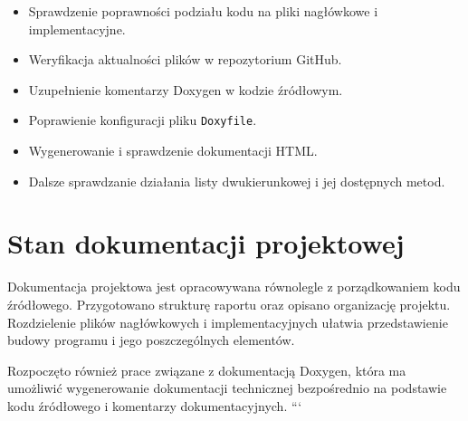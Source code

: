 \begin{itemize}
    \item Sprawdzenie poprawności podziału kodu na pliki
    nagłówkowe i implementacyjne.
    \item Weryfikacja aktualności plików w repozytorium GitHub.
    \item Uzupełnienie komentarzy Doxygen w kodzie źródłowym.
    \item Poprawienie konfiguracji pliku \texttt{Doxyfile}.
    \item Wygenerowanie i sprawdzenie dokumentacji HTML.
    \item Dalsze sprawdzanie działania listy dwukierunkowej
    i jej dostępnych metod.
\end{itemize}

\section{Stan dokumentacji projektowej}

Dokumentacja projektowa jest opracowywana równolegle
z porządkowaniem kodu źródłowego. Przygotowano strukturę
raportu oraz opisano organizację projektu. Rozdzielenie
plików nagłówkowych i implementacyjnych ułatwia przedstawienie
budowy programu i jego poszczególnych elementów.

Rozpoczęto również prace związane z dokumentacją Doxygen,
która ma umożliwić wygenerowanie dokumentacji technicznej
bezpośrednio na podstawie kodu źródłowego i komentarzy
dokumentacyjnych.
```